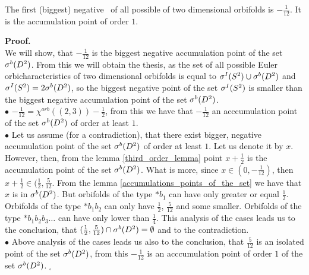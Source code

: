 \begin{theorem}
The first (biggest) negative \apots\ of all possible \Eoc of two dimensional orbifolds is 
$-\frac{1}{12}$. It is the accumulation point of order $1$. 
\end{theorem}
\noindent\textbf{Proof.} \\
We will show, that $-\frac{1}{12}$ is the biggest negative accumulation point of the set ${\mathcal{\sigma}^b(D^2)}$. 
From this we will obtain the thesis, as the set of all possible Euler orbicharacteristics 
of two dimensional orbifolds is equal to ${\mathcal{\sigma}^I(S^2)} \cup {\mathcal{\sigma}^b(D^2)}$ and ${\mathcal{\sigma}^I(S^2)} = 2{\mathcal{\sigma}^b(D^2)}$, so 
the biggest negative point of the set ${\mathcal{\sigma}^I(S^2)}$ is smaller than the biggest negative accumulation 
point of the set ${\mathcal{\sigma}^b(D^2)}$. \\
$\bullet$ $-\frac{1}{12}=\chi^{orb}((2,3))-\frac{1}{2}$, from this we have that $-\frac{1}{12}$ 
an acccumulation point of the set ${\mathcal{\sigma}^b(D^2)}$ of order at least $1$. \\
$\bullet$ Let us assume (for a contradiction), that there exist bigger, negative 
accumulation point of the set ${\mathcal{\sigma}^b(D^2)}$ of order at least $1$. Let us denote it by $x$. \\
However, then, from the lemma \ref{third_order_lemma} point $x+\frac{1}{2}$ is the accumulation 
point of the set ${\mathcal{\sigma}^b(D^2)}$. What is more, since $x\in (0, -\frac{1}{12})$, then $x+\frac{1}{2} 
\in (\frac{1}{2}, \frac{5}{12}$. From the lemma \ref{accumulations_points_of_the_set} we 
have that $x$ is in ${\mathcal{\sigma}^b(D^2)}$. But orbifolds of the type $*b_1$ can have \Eoc only greater or 
equal $\frac{1}{2}$. Orbifolds of the type $*b_1b_2$ can only have \Eoc $\frac{1}{2}$, 
$\frac{5}{12}$ and some smaller. Orbifolds of the type $*b_1b_2b_3\dots$ can have \Eoc only 
lower than $\frac{1}{4}$. This analysis of the cases leads us to the conclusion, that 
$(\frac{1}{2},\frac{5}{12})\cap {\mathcal{\sigma}^b(D^2)}=\emptyset$ and to the contradiction. \\
$\bullet$ Above analysis of the cases leads us also to the conclusion, that $\frac{5}{12}$ 
is 
an isolated point of the set ${\mathcal{\sigma}^b(D^2)}$, from this $-\frac{1}{12}$ is an acccumulation point 
of order $1$ of the set ${\mathcal{\sigma}^b(D^2)}$. $_\square$ \\ 
 








